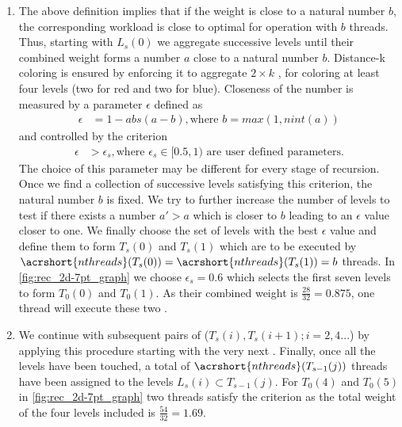 \begin{enumerate}
	\item The above definition implies that if the weight is close to a natural number $b$, the corresponding workload is close to optimal for operation with $b$ threads. Thus, starting with $L_s(0)$ we aggregate successive levels until their combined weight forms a number $a$ close to a natural number $b$. Distance-k coloring is ensured by enforcing it to aggregate \atleast $2 \times k$ \levels, \ie for \DTWO coloring at least four levels (two for red and two for blue). Closeness of the number is measured by a parameter $\epsilon$ defined as
	\begin{align*}
		\epsilon &=  1 - abs(a-b), \text{where } b= max(1,nint(a))
	\end{align*}
	and controlled by the criterion
	\begin{align*}
	\epsilon &> \epsilon_s, \text{where $\epsilon_s \in  [0.5,1)$ are user defined parameters.} 	
	\end{align*}		   
	The choice of this parameter may be different for every stage of recursion. 
	 Once we find a collection of successive levels satisfying this criterion, the natural number $b$ is fixed. We try to further increase the number of levels to test if there exists a number $a'>a$ which is closer to $b$ leading to an $\epsilon$ value closer to one. We finally choose the set of levels with the best $\epsilon$ value and define them to form $T_s(0)$ and $T_s(1)$ which are to be executed by $\acrshort{nthreads}(T_s(0))=\acrshort{nthreads}(T_s(1))=b$ threads.	 
	 In \cref{fig:rec_2d-7pt_graph} we choose $\epsilon_s = 0.6$ which selects the first seven levels to form $T_0(0)$ and $T_0(1)$.  As their combined weight is $\frac{28}{32}=0.875$,  one thread will execute these two \levelGroups. 

	\item We continue with subsequent pairs of \levelGroups ($T_s(i), T_s(i+1); i=2,4 ...$) by applying this procedure starting with the very next \level. Finally, once all the levels have been touched, a total of $\acrshort{nthreads}(T_{s-1}(j))$ threads have been assigned to the levels $L_s(i) \subset T_{s-1}(j)$. For $T_0(4)$ and $T_0(5)$  in \cref{fig:rec_2d-7pt_graph} two threads satisfy the criterion as the total weight of the four levels included is $\frac{54}{32}=1.69$.
	

\end{enumerate}
